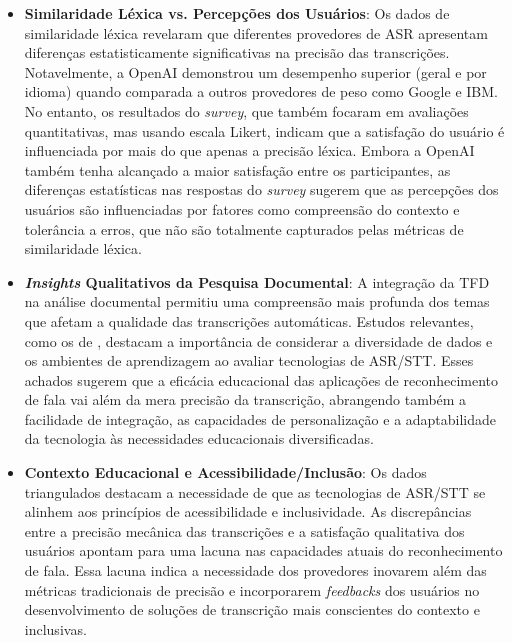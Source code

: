 \begin{itemize}

\item \textbf{Similaridade Léxica vs. Percepções dos Usuários}: Os dados de similaridade léxica revelaram que diferentes provedores de ASR apresentam diferenças estatisticamente significativas na precisão das transcrições. Notavelmente, a OpenAI demonstrou um desempenho superior (geral e por idioma) quando comparada a outros provedores de peso como Google e IBM. No entanto, os resultados do \textit{survey}, que também focaram em avaliações quantitativas, mas usando escala Likert, indicam que a satisfação do usuário é influenciada por mais do que apenas a precisão léxica. Embora a OpenAI também tenha alcançado a maior satisfação entre os participantes, as diferenças estatísticas nas respostas do \textit{survey} sugerem que as percepções dos usuários são influenciadas por fatores como compreensão do contexto e tolerância a erros, que não são totalmente capturados pelas métricas de similaridade léxica.

\item \textbf{\textit{Insights} Qualitativos da Pesquisa Documental}: A integração da TFD \cite{Charmaz2009} na análise documental permitiu uma compreensão mais profunda dos temas que afetam a qualidade das transcrições automáticas. Estudos relevantes, como os de , destacam a importância de considerar a diversidade de dados e os ambientes de aprendizagem ao avaliar tecnologias de ASR/STT. Esses achados sugerem que a eficácia educacional das aplicações de reconhecimento de fala vai além da mera precisão da transcrição, abrangendo também a facilidade de integração, as capacidades de personalização e a adaptabilidade da tecnologia às necessidades educacionais diversificadas.

\item \textbf{Contexto Educacional e Acessibilidade/Inclusão}: Os dados triangulados destacam a necessidade de que as tecnologias de ASR/STT se alinhem aos princípios de acessibilidade e inclusividade. As discrepâncias entre a precisão mecânica das transcrições e a satisfação qualitativa dos usuários apontam para uma lacuna nas capacidades atuais do reconhecimento de fala. Essa lacuna indica a necessidade dos provedores inovarem além das métricas tradicionais de precisão e incorporarem \textit{feedbacks} dos usuários no desenvolvimento de soluções de transcrição mais conscientes do contexto e inclusivas.

\end{itemize}

